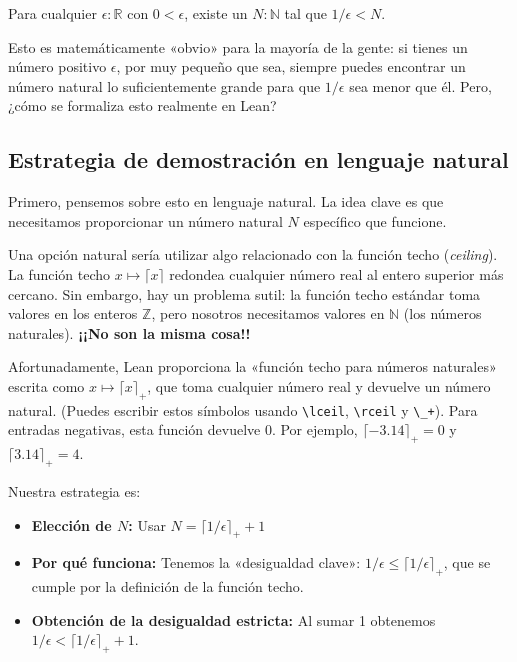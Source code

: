 \documentclass[a4paper,12pt,twoside]{book}
\begin{document}
\begin{teorema}
Para cualquier \(\epsilon : \mathbb{R}\) con \(0 < \epsilon\), existe un \(N : \mathbb{N}\) tal que \(1/\epsilon < N\).
\end{teorema}

Esto es matemáticamente «obvio» para la mayoría de la gente: si tienes
un número positivo \(\epsilon\), por muy pequeño que sea, siempre puedes
encontrar un número natural lo suficientemente grande para que
\(1/\epsilon\) sea menor que él. Pero, ¿cómo se formaliza esto realmente
en Lean?

\subsection{Estrategia de demostración en lenguaje natural}
\label{sec:orge73f18e}

Primero, pensemos sobre esto en lenguaje natural. La idea clave es que
necesitamos proporcionar un número natural \(N\) específico que funcione.

Una opción natural sería utilizar algo relacionado con la función techo
(\emph{ceiling}). La función techo \(x \mapsto \lceil x \rceil\) redondea
cualquier número real al entero superior más cercano. Sin embargo, hay
un problema sutil: la función techo estándar toma valores en los enteros
\(\mathbb{Z}\), pero nosotros necesitamos valores en \(\mathbb{N}\) (los
números naturales). \textbf{¡¡No son la misma cosa!!}

Afortunadamente, Lean proporciona la «función techo para números
naturales» escrita como \(x \mapsto \lceil x \rceil_+\), que toma
cualquier número real y devuelve un número natural. (Puedes escribir
estos símbolos usando \texttt{\textbackslash{}lceil}, \texttt{\textbackslash{}rceil} y \texttt{\textbackslash{}\_+}). Para entradas negativas,
esta función devuelve 0. Por ejemplo, \(\lceil -3.14 \rceil_+ = 0\) y
\(\lceil 3.14 \rceil_+ = 4\).

Nuestra estrategia es:
\begin{itemize}
\item \textbf{Elección de \(N\):} Usar \(N = \lceil 1/\epsilon \rceil_+ + 1\)
\item \textbf{Por qué funciona:} Tenemos la «desigualdad clave»: \(1/\epsilon \le
  \lceil 1/\epsilon \rceil_+\), que se cumple por la definición de la
función techo.
\item \textbf{Obtención de la desigualdad estricta:} Al sumar 1 obtenemos \(1/\epsilon < \lceil 1/\epsilon \rceil_+ + 1\).
\end{itemize}
\end{document}
